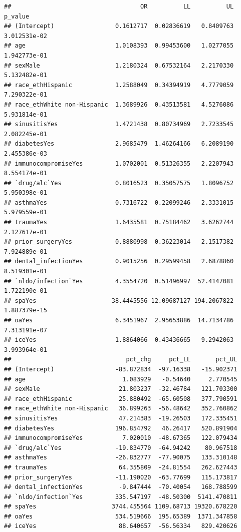 \documentclass[
]{article}
\begin{document}
\begin{verbatim}
##                                    OR          LL          UL      p_value
## (Intercept)                 0.1612717  0.02836619   0.8409763 3.012531e-02
## age                         1.0108393  0.99453600   1.0277055 1.942773e-01
## sexMale                     1.2180324  0.67532164   2.2170330 5.132482e-01
## race_ethHispanic            1.2588049  0.34394919   4.7779059 7.290322e-01
## race_ethWhite non-Hispanic  1.3689926  0.43513581   4.5276086 5.931814e-01
## sinusitisYes                1.4721438  0.80734969   2.7233545 2.082245e-01
## diabetesYes                 2.9685479  1.46264166   6.2089190 2.455386e-03
## immunocompromiseYes         1.0702001  0.51326355   2.2207943 8.554174e-01
## `drug/alc`Yes               0.8016523  0.35057575   1.8096752 5.950398e-01
## asthmaYes                   0.7316722  0.22099246   2.3331015 5.979559e-01
## traumaYes                   1.6435581  0.75184462   3.6262744 2.127617e-01
## prior_surgeryYes            0.8880998  0.36223014   2.1517382 7.924889e-01
## dental_infectionYes         0.9015256  0.29599458   2.6878860 8.519301e-01
## `nldo/infection`Yes         4.3554720  0.51496997  52.4147081 1.722190e-01
## spaYes                     38.4445556 12.09687127 194.2067822 1.887379e-15
## oaYes                       6.3451967  2.95653886  14.7134786 7.313191e-07
## iceYes                      1.8864066  0.43436665   9.2942063 3.993964e-01
##                                pct_chg     pct_LL       pct_UL
## (Intercept)                 -83.872834  -97.16338   -15.902371
## age                           1.083929   -0.54640     2.770545
## sexMale                      21.803237  -32.46784   121.703300
## race_ethHispanic             25.880492  -65.60508   377.790591
## race_ethWhite non-Hispanic   36.899263  -56.48642   352.760862
## sinusitisYes                 47.214383  -19.26503   172.335451
## diabetesYes                 196.854792   46.26417   520.891904
## immunocompromiseYes           7.020010  -48.67365   122.079434
## `drug/alc`Yes               -19.834770  -64.94242    80.967518
## asthmaYes                   -26.832777  -77.90075   133.310148
## traumaYes                    64.355809  -24.81554   262.627443
## prior_surgeryYes            -11.190020  -63.77699   115.173817
## dental_infectionYes          -9.847444  -70.40054   168.788599
## `nldo/infection`Yes         335.547197  -48.50300  5141.470811
## spaYes                     3744.455564 1109.68713 19320.678220
## oaYes                       534.519666  195.65389  1371.347858
## iceYes                       88.640657  -56.56334   829.420626

\end{verbatim}
\end{document}
